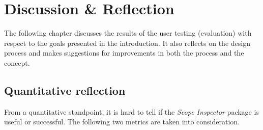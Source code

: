\chapter{Discussion \& Reflection}\label{discussion-reflection}

The following chapter discusses the results of the user testing
(evaluation) with respect to the goals presented in the introduction. It
also reflects on the design process and makes suggestions for
improvements in both the process and the concept.

\section{Quantitative reflection}\label{quantitative-reflection}

From a quantitative standpoint, it is hard to tell if the \emph{Scope
Inspector} package is useful or successful. The following two metrics
are taken into consideration.

